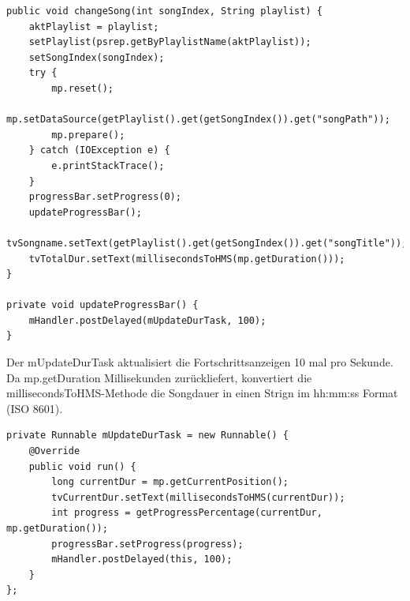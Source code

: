 \documentclass[FIPLY_base.tex]{subfiles}
\begin{document}
\begin{lstlisting}
public void changeSong(int songIndex, String playlist) {
    aktPlaylist = playlist;
    setPlaylist(psrep.getByPlaylistName(aktPlaylist));
    setSongIndex(songIndex);
    try {
        mp.reset();
        mp.setDataSource(getPlaylist().get(getSongIndex()).get("songPath"));
        mp.prepare();
    } catch (IOException e) {
        e.printStackTrace();
    }
    progressBar.setProgress(0);
    updateProgressBar();
    tvSongname.setText(getPlaylist().get(getSongIndex()).get("songTitle"));
    tvTotalDur.setText(millisecondsToHMS(mp.getDuration()));
}

private void updateProgressBar() {
    mHandler.postDelayed(mUpdateDurTask, 100);
}
\end{lstlisting}
Der mUpdateDurTask aktualisiert die Fortschrittsanzeigen 10 mal pro Sekunde.
Da mp.getDuration Millisekunden zurückliefert, konvertiert die millisecondsToHMS-Methode die Songdauer in einen Strign im hh:mm:ss Format (ISO 8601).

\begin{lstlisting}
private Runnable mUpdateDurTask = new Runnable() {
    @Override
    public void run() {
        long currentDur = mp.getCurrentPosition();
        tvCurrentDur.setText(millisecondsToHMS(currentDur));
        int progress = getProgressPercentage(currentDur, mp.getDuration());
        progressBar.setProgress(progress);
        mHandler.postDelayed(this, 100);
    }
};
\end{lstlisting}
\end{document}

